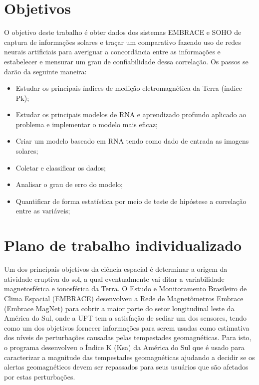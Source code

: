 \documentclass[12pt,consuni]{uftpibic}
\begin{document}
\vspace{1.5cm}
\chapter{Objetivos}

O objetivo deste trabalho é obter dados dos sistemas EMBRACE e SOHO de captura de informações solares e traçar um comparativo fazendo uso de redes neurais artificiais para averiguar a concordância entre as informações e estabelecer e mensurar um grau de confiabilidade dessa correlação. Os passos se darão da seguinte maneira:

\begin{itemize}
\item Estudar os principais índices de medição eletromagnética da Terra (índice Pk);
\item Estudar os principais modelos de RNA e aprendizado profundo aplicado ao problema e implementar o modelo mais eficaz;
\item Criar um modelo baseado em RNA tendo como dado de entrada as imagens solares;
\item Coletar e classificar os dados;
\item Analisar o grau de erro do modelo;
\item Quantificar de forma estatística por meio de teste de hipóstese a correlação entre as variáveis;
\end{itemize}


\vspace{1.5cm}
\chapter{Plano de trabalho individualizado}

Um dos principais objetivos da ciência espacial é determinar a origem da atividade eruptiva do sol, a qual eventualmente vai ditar a variabilidade magnetosférica e ionosférica da Terra. O Estudo e Monitoramento Brasileiro de Clima Espacial (EMBRACE) desenvolveu a Rede de Magnetômetros Embrace (Embrace MagNet) para cobrir a maior parte do setor longitudinal leste da América do Sul, onde a UFT tem a satisfação de sediar um dos sensores, tendo como um dos objetivos fornecer informações para serem usadas como estimativa dos níveis de perturbações causadas pelas tempestades geomagnéticas. Para isto, o programa desenvolveu o Índice K (Ksa) da América do Sul que é usado para caracterizar a magnitude das tempestades geomagnéticas ajudando a decidir se os alertas geomagnéticos devem ser repassados para seus usuários que são afetados por estas perturbações.
\end{document}
